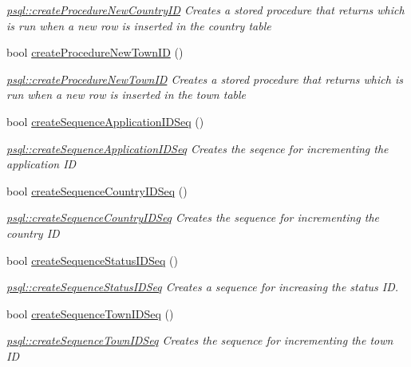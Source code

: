 \begin{DoxyCompactItemize}
\begin{DoxyCompactList}\small\item\em \hyperlink{classpsql_a565bfc828ecb6b5621354128773494fd}{psql\+::create\+Procedure\+New\+Country\+ID} Creates a stored procedure that returns which is run when a new row is inserted in the country table \end{DoxyCompactList}\item 
bool \hyperlink{classpsql_ade0c7fa4f019c3f349230af09b1de49e}{create\+Procedure\+New\+Town\+ID} ()
\begin{DoxyCompactList}\small\item\em \hyperlink{classpsql_ade0c7fa4f019c3f349230af09b1de49e}{psql\+::create\+Procedure\+New\+Town\+ID} Creates a stored procedure that returns which is run when a new row is inserted in the town table \end{DoxyCompactList}\item 
bool \hyperlink{classpsql_a54c75d0896ee6aad58e22c830895c106}{create\+Sequence\+Application\+I\+D\+Seq} ()
\begin{DoxyCompactList}\small\item\em \hyperlink{classpsql_a54c75d0896ee6aad58e22c830895c106}{psql\+::create\+Sequence\+Application\+I\+D\+Seq} Creates the seqence for incrementing the application ID \end{DoxyCompactList}\item 
bool \hyperlink{classpsql_aa907c84f592212451d3d59a2061adabd}{create\+Sequence\+Country\+I\+D\+Seq} ()
\begin{DoxyCompactList}\small\item\em \hyperlink{classpsql_aa907c84f592212451d3d59a2061adabd}{psql\+::create\+Sequence\+Country\+I\+D\+Seq} Creates the sequence for incrementing the country ID \end{DoxyCompactList}\item 
bool \hyperlink{classpsql_ae882aa80b2d629383fc2e60aecfd421a}{create\+Sequence\+Status\+I\+D\+Seq} ()
\begin{DoxyCompactList}\small\item\em \hyperlink{classpsql_ae882aa80b2d629383fc2e60aecfd421a}{psql\+::create\+Sequence\+Status\+I\+D\+Seq} Creates a sequence for increasing the status ID. \end{DoxyCompactList}\item 
bool \hyperlink{classpsql_a6ce21cb5a1e77cb0c280e2932d2b557d}{create\+Sequence\+Town\+I\+D\+Seq} ()
\begin{DoxyCompactList}\small\item\em \hyperlink{classpsql_a6ce21cb5a1e77cb0c280e2932d2b557d}{psql\+::create\+Sequence\+Town\+I\+D\+Seq} Creates the sequence for incrementing the town ID \end{DoxyCompactList}\item 

\end{DoxyCompactItemize}
